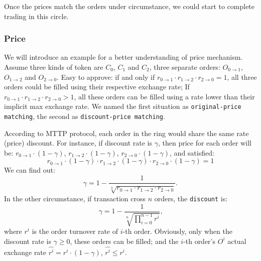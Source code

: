\documentclass[UTF8,nofonts]{article}
\begin{document}
Once the prices match the orders under circumstance,  we could start to complete trading in this circle.

\subsubsection{Price\label{sec: matchprice}}
We will introduce an example for a better understanding of price mechanism. Assume three kinds of token are $C_{0}$, $C_{1}$ and $C_{2}$, three separate orders: $O_{0\rightarrow 1}$, $O_{1 \rightarrow 2}$ and $O_{2 \rightarrow 0}$. Easy to approve: if and only if $r_{0 \rightarrow 1} \cdot r_{1 \rightarrow 2}\cdot r_{2 \rightarrow 0} = 1$,  all three orders could be filled using their respective exchange rate; If $r_{0 \rightarrow 1} \cdot r_{1 \rightarrow 2}\cdot r_{2 \rightarrow 0} > 1$, all these orders can be filled using a rate lower than their implicit max exchange rate. We named the first situation as \texttt{original-price matching}, the second as \texttt{discount-price matching}.

According to MTTP protocol, each order in the ring would share the same rate (price) discount. For instance, if discount rate is $\gamma$, then price for each order will be:
$r_{0\rightarrow 1} \cdot (1-\gamma)$, $r_{1\rightarrow 2} \cdot (1-\gamma)$, $r_{2 \rightarrow 0} \cdot (1-\gamma)$, and satisfied: 
\begin{equation}
r_{0\rightarrow 1} \cdot (1-\gamma)\cdot r_{1\rightarrow 2} \cdot (1-\gamma) \cdot r_{2 \rightarrow 0} \cdot (1-\gamma) = 1
\end{equation}
We can find out: 
\begin{equation*}
\gamma = 1- \frac{1}{\sqrt[3]{r_{0\rightarrow 1} \cdot r_{1\rightarrow 2} \cdot r_{2\rightarrow 0}}}\text{.}
\end{equation*}
In the other circumstance, if transaction cross $n$ orders, the \texttt{discount} is: 
\begin{equation*}
\gamma = 1- \frac{1}{\sqrt[n]{\prod_{i=0}^{n-1} r^i}} \text{,}
\end{equation*}
where $r^i$ is the order turnover rate of $i$-th order. Obviously, only when the discount rate is $\gamma \ge 0$, these orders can be filled; and the $i$-th order's $O^i$ actual exchange rate $\hat{r^i} = r^i \cdot (1-\gamma)$, $\hat{r^i}\le r^i$.

\end{document}

